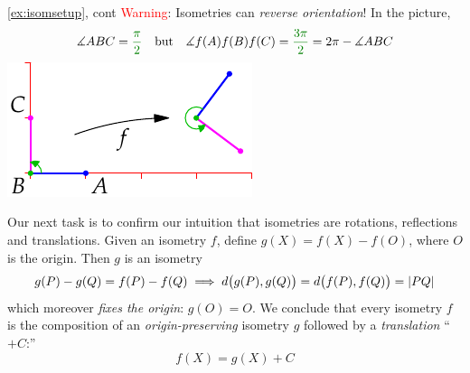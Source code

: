\begin{example*}[lower separated=false, sidebyside, sidebyside align=top seam, sidebyside gap=0pt, righthand width=0.32\linewidth]{\ref{ex:isomsetup}, cont}{}
	\textcolor{red}{Warning}: Isometries can \emph{reverse orientation}! In the picture,
	\[
		\measuredangle ABC=\textcolor{Green}{\frac\pi 2}
		\quad\text{but}\quad
		\measuredangle f(A)f(B)f(C)=\textcolor{Green}{\frac{3\pi}2}=2\pi-\measuredangle ABC
	\]
	\tcblower
	\flushright
	\includegraphics{isom-refl2}
\end{example*}

Our next task is to confirm our intuition that isometries are rotations, reflections and translations. Given an isometry $f$, define $g(X)=f(X)-f(O)$, where $O$ is the origin. Then $g$ is an isometry
\[
	g(P)-g(Q)=f(P)-f(Q)\implies d\bigl(g(P),g(Q)\bigr)=d\bigl(f(P),f(Q)\bigr)=\left| PQ\right|
\]
which moreover \emph{fixes the origin}: $g(O)=O$. We conclude that every isometry $f$ is the composition of an \emph{origin-preserving} isometry $g$ followed by a \emph{translation} ``$+C$:''
\[
	f(X)=g(X)+C
\]

\goodbreak

